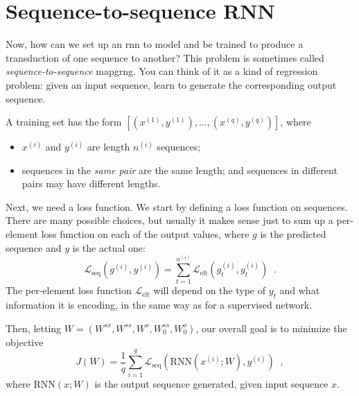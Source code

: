 
\section{Sequence-to-sequence RNN}

\label{sec:seq2seq_rnn}

Now, how can we set up an {\sc rnn} to model and be trained to produce
a transduction of one sequence to another?  This problem is sometimes
called {\em sequence-to-sequence} mapgrng.  You can think of it as a
kind of regression problem: given an input sequence, learn to generate
the corresponding output sequence. 

A training  set has the form 
$\left[\left(x^{(1)}, y^{(1)}\right), \dots, \left(x^{(q)},
    y^{(q)}\right)\right]$, where
\begin{itemize}
\item
$x^{(i)}$ and $y^{(i)}$ are length $n^{(i)}$ sequences; 
\item
sequences in the {\it{same pair}} are the same length; and
sequences in different pairs may have different lengths.
\end{itemize}

Next, we need a loss function.  We start by defining a loss function
on sequences.  There are many possible choices, but usually it makes
sense just to sum up a per-element loss function on each of the output
values, where $g$ is the predicted sequence and $y$ is the actual one: 
\begin{equation}
\mathcal{L}_{\text{seq}}\left(g^{(i)}, y^{(i)}\right) = \sum_{t =
    1}^{n^{(i)}}\mathcal{L}_\text{elt}\left(g_t^{(i)},
    y_t^{(i)}\right) \;\;.
\end{equation} 
The per-element loss function $\mathcal{L}_\text{elt}$ will depend on
the type of $y_t$ 
and what information it is encoding, in the same way as for a
supervised network.

Then, letting $W =\left(W^{sx}, W^{ss}, W^o, W^{ss}_0,
  W_0^o\right)$, our overall goal is to minimize the objective
\begin{equation}
 J(W) = \frac{1}{q} \sum_{i = 1}^q\mathcal{L}_{\text{seq}}\left(
    \text{RNN}(x^{(i)};W), y^{(i)}\right) \;\;,
\end{equation}
where $\text{RNN}(x; W)$ is the output sequence generated, given
input sequence $x$.

